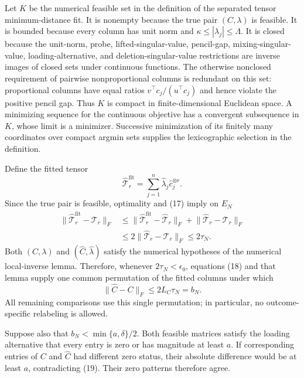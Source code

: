 Let \(K\) be the numerical feasible set in the definition of the separated tensor minimum-distance fit. It is nonempty because the true pair \((C,\lambda)\) is feasible. It is bounded because every column has unit norm and \(\kappa\le|\lambda_j|\le\Lambda\). It is closed because the unit-norm, probe, lifted-singular-value, pencil-gap, mixing-singular-value, loading-alternative, and deletion-singular-value restrictions are inverse images of closed sets under continuous functions. The otherwise nonclosed requirement of pairwise nonproportional columns is redundant on this set: proportional columns have equal ratios \(v^\top c_j/(u^\top c_j)\) and hence violate the positive pencil gap. Thus \(K\) is compact in finite-dimensional Euclidean space. A minimizing sequence for the continuous objective has a convergent subsequence in \(K\), whose limit is a minimizer. Successive minimization of its finitely many coordinates over compact argmin sets supplies the lexicographic selection in the definition.

Define the fitted tensor
\[
 \widehat{\mathcal T}^{\mathrm{fit}}_r
 =\sum_{j=1}^n\widehat\lambda_j\widehat c_j^{\otimes r}.
\]
Since the true pair is feasible, optimality and (17) imply on \(E_N\)
\[
 \begin{aligned}
 \lVert\widehat{\mathcal T}^{\mathrm{fit}}_r-\mathcal T_r\rVert_F
 &\le
 \lVert\widehat{\mathcal T}^{\mathrm{fit}}_r-
 \widehat{\mathcal T}_r\rVert_F
 +\lVert\widehat{\mathcal T}_r-\mathcal T_r\rVert_F\\
 &\le2\lVert\widehat{\mathcal T}_r-\mathcal T_r\rVert_F
 \le2\tau_N.
 \end{aligned}
 \tag{18}
\]
Both \((C,\lambda)\) and \((\widehat C,\widehat\lambda)\) satisfy the numerical hypotheses of the numerical local-inverse lemma. Therefore, whenever \(2\tau_N<\epsilon_0\), equations (18) and that lemma supply one common permutation of the fitted columns under which
\[
 \lVert\widehat C-C\rVert_F
 \le2L_C\tau_N=b_N.
 \tag{19}
\]
All remaining comparisons use this single permutation; in particular, no outcome-specific relabeling is allowed.

Suppose also that \(b_N<\min\{a,\delta\}/2\). Both feasible matrices satisfy the loading alternative that every entry is zero or has magnitude at least \(a\). If corresponding entries of \(C\) and \(\widehat C\) had different zero status, their absolute difference would be at least \(a\), contradicting (19). Their zero patterns therefore agree.


